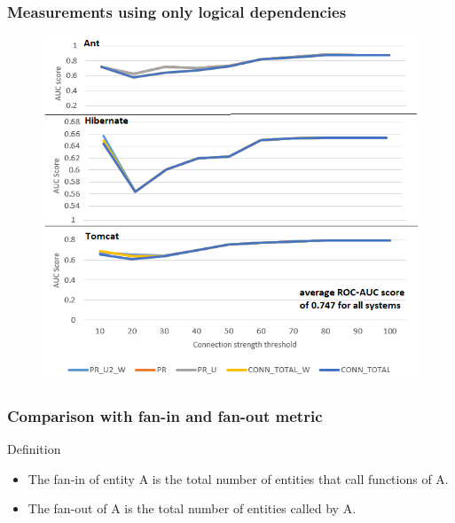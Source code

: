 \documentclass{beamer}
\begin{document}
 \begin{frame}
\frametitle{Measurements using only logical dependencies}
 \begin{center}
     \begin{figure}
	\includegraphics[scale=0.68]{ld_measurements.png}
     \end{figure}
\end{center}
\end{frame}


 \begin{frame}
\frametitle{Comparison with fan-in and fan-out metric}
\begin{block}{Definition}


\begin{itemize}
\item The fan-in of entity A is the total number of entities that call functions of A.
\item The fan-out of A is the total number of entities called by A.
\end{itemize}

\end{block}
\end{frame}


\end{document}

